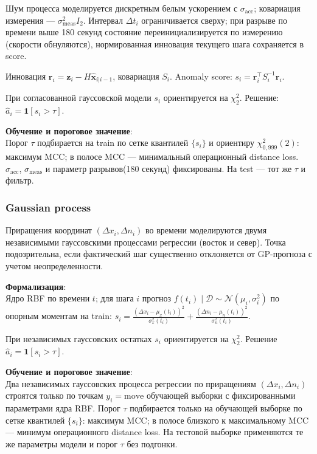 \documentclass[a4paper,12pt]{report}
\begin{document}
	Шум процесса моделируется дискретным белым ускорением с $\sigma_{\mathrm{acc}}$; ковариация измерения — $\sigma_{\mathrm{meas}}^2 I_2$. Интервал $\Delta t_i$ ограничивается сверху; при разрыве по времени выше 180 секунд состояние переинициализируется по измерению (скорости обнуляются), нормированная инновация текущего шага сохраняется в score.

	Инновация $\mathbf{r}_i = \mathbf{z}_i - H\hat{\mathbf{x}}_{i|i-1}$, ковариация $S_i$. Anomaly score: $s_i = \mathbf{r}_i^\top S_i^{-1}\mathbf{r}_i.$

	При согласованной гауссовской модели $s_i$ ориентируется на $\chi^2_2$. Решение: $\hat a_i = \mathbf{1}[s_i > \tau]$.

	\textbf{Обучение и пороговое значение}:\\
	Порог $\tau$ подбирается на train по сетке квантилей $\{s_i\}$ и ориентиру $\chi^2_{0{,}999}(2)$: максимум MCC; в полосе MCC — минимальный операционный distance loss. $\sigma_{\mathrm{acc}}$, $\sigma_{\mathrm{meas}}$ и параметр разрывов(180 секунд) фиксированы. На test — тот же $\tau$ и фильтр.

	\subsubsection{Gaussian process}
	Приращения координат $(\Delta x_i, \Delta n_i)$ во времени моделируются двумя независимыми гауссовскими процессами регрессии (восток и север). Точка подозрительна, если фактический шаг существенно отклоняется от GP-прогноза с учетом неопределенности.

	\textbf{Формализация}:\\
	Ядро RBF по времени $t$; для шага $i$ прогноз $f(t_i)\mid\mathcal{D}\sim\mathcal{N}(\mu_i,\sigma_i^2)$ по опорным моментам на train: $s_i = \frac{(\Delta x_i-\mu_x(t_i))^2}{\sigma_x^2(t_i)} + \frac{(\Delta n_i-\mu_n(t_i))^2}{\sigma_n^2(t_i)}.$

	При независимых гауссовских остатках $s_i$ ориентируется на $\chi^2_2$. Решение $\hat a_i=\mathbf{1}[s_i>\tau]$.

	\textbf{Обучение и пороговое значение}:\\
	Два независимых гауссовских процесса регрессии по приращениям $(\Delta x_i,\Delta n_i)$ строятся только по точкам $y_i=\mathrm{move}$ обучающей выборки с фиксированными параметрами ядра RBF. Порог $\tau$ подбирается только на обучающей выборке по сетке квантилей $\{s_i\}$: максимум MCC; в полосе близкого к максимальному MCC — минимум операционного distance loss. На тестовой выборке применяются те же параметры модели и порог $\tau$ без подгонки.
\end{document}
